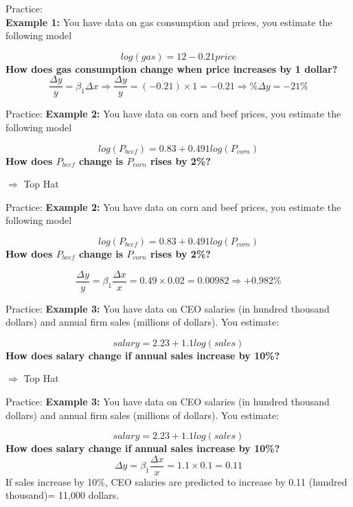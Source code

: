 \documentclass[
  ignorenonframetext,
]{beamer}
\begin{document}
\begin{frame}{Practice:\\
}
\protect\hypertarget{practice-1}{}
\textbf{Example 1:} You have data on gas consumption and prices, you
estimate the following model

\[
log(gas)=12-0.21price
\] \textbf{How does gas consumption change when price increases by 1
dollar?} \[
\frac{\Delta y}{y}=\beta_1\Delta x \Rightarrow \frac{\Delta y}{y}=(-0.21)\times 1= -0.21\Rightarrow \%\Delta y=-21\%
\]
\end{frame}

\begin{frame}{Practice:}
\protect\hypertarget{practice-2}{}
\textbf{Example 2:} You have data on corn and beef prices, you estimate
the following model

\[
log(P_{beef})=0.83+0.491log(P_{corn})
\] \textbf{How does \(P_{beef}\) change is \(P_{corn}\) rises by 2\%?}

\(\Rightarrow\) Top Hat
\end{frame}

\begin{frame}{Practice:}
\protect\hypertarget{practice-3}{}
\textbf{Example 2:} You have data on corn and beef prices, you estimate
the following model

\[
log(P_{beef})=0.83+0.491log(P_{corn})
\] \textbf{How does \(P_{beef}\) change is \(P_{corn}\) rises by 2\%?}

\[
\frac{\Delta y}{y}=\beta_1\frac{\Delta x}{x}=0.49\times0.02= 0.00982\Rightarrow +0.982\%
\]
\end{frame}

\begin{frame}{Practice:}
\protect\hypertarget{practice-4}{}
\textbf{Example 3:} You have data on CEO salaries (in hundred thousand
dollars) and annual firm sales (millions of dollars). You estimate:

\[
salary=2.23+1.1log(sales)
\] \textbf{How does salary change if annual sales increase by 10\%?}

\(\Rightarrow\) Top Hat
\end{frame}

\begin{frame}{Practice:}
\protect\hypertarget{practice-5}{}
\textbf{Example 3:} You have data on CEO salaries (in hundred thousand
dollars) and annual firm sales (millions of dollars). You estimate:

\[
salary=2.23+1.1log(sales)
\] \textbf{How does salary change if annual sales increase by 10\%?} \[
\Delta y=\beta_1\frac{\Delta x}{x}=1.1\times0.1=0.11
\] If sales increase by 10\%, CEO salaries are predicted to increase by
0.11 (hundred thousand)= 11,000 dollars.
\end{frame}
\end{document}

